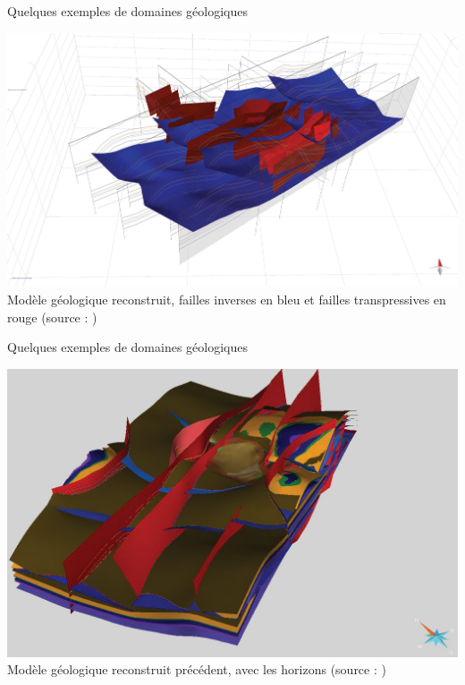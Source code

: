 \documentclass[aspectratio=169, 12pt, a4paper, hyperref={pdfauthor={Alexandre MARIN}, pdfkeywords={IFPEN, Delaunay, Voronoi, mesh generation}, colorlinks=true, linkcolor=purple, urlcolor=blue, citecolor=magenta}]{beamer}
\begin{document}
\begin{Energie}{\small Quelques exemples de domaines géologiques}
\begin{center}
\includegraphics[scale=0.25]{thrusts.jpg}
\\Modèle géologique reconstruit, failles inverses en bleu et failles transpressives en rouge (source : \cite{Sicily})
\end{center}
\end{Energie}

\begin{Energie}{\small Quelques exemples de domaines géologiques}
\begin{center}
\includegraphics[scale=0.35]{thrustsHorizons.png}
\\Modèle géologique reconstruit précédent, avec les horizons (source : \cite{Sicily})
\end{center}
\end{Energie}
\end{document}
